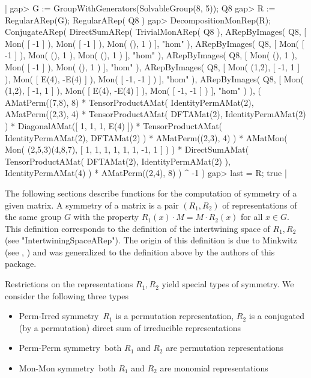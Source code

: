 |    gap> G := GroupWithGenerators(SolvableGroup(8, 5));
    Q8
    gap> R := RegularARep(G);
    RegularARep( Q8 )
    gap> DecompositionMonRep(R);
    ConjugateARep(
      DirectSumARep(
        TrivialMonARep( Q8 ),
        ARepByImages(
          Q8,
          [ Mon( [ -1 ] ), Mon( [ -1 ] ), Mon( (), 1 ) ],
          "hom"
        ),
        ARepByImages(
          Q8,
          [ Mon( [ -1 ] ), Mon( (), 1 ), Mon( (), 1 ) ],
          "hom"
        ),
        ARepByImages(
          Q8,
          [ Mon( (), 1 ), Mon( [ -1 ] ), Mon( (), 1 ) ],
          "hom"
        ),
        ARepByImages(
          Q8,
          [ Mon( (1,2), [ -1, 1 ] ), 
            Mon( [ E(4), -E(4) ] ), 
            Mon( [ -1, -1 ] )
          ],
          "hom"
        ),
        ARepByImages(
          Q8,
          [ Mon( (1,2), [ -1, 1 ] ),
            Mon( [ E(4), -E(4) ] ),
            Mon( [ -1, -1 ] )
          ],
          "hom"
        )
      ),
      ( AMatPerm((7,8), 8) *
        TensorProductAMat(
          IdentityPermAMat(2),
          AMatPerm((2,3), 4) *
          TensorProductAMat(
            DFTAMat(2),
            IdentityPermAMat(2)
          ) *
          DiagonalAMat([ 1, 1, 1, E(4) ]) *
          TensorProductAMat(
            IdentityPermAMat(2),
            DFTAMat(2)
          ) *
          AMatPerm((2,3), 4)
        ) *
        AMatMon( Mon(
          (2,5,3)(4,8,7),
          [ 1, 1, 1, 1, 1, 1, -1, 1 ]
        ) ) *
        DirectSumAMat(
          TensorProductAMat(
            DFTAMat(2),
            IdentityPermAMat(2)
          ),
          IdentityPermAMat(4)
        ) *
        AMatPerm((2,4), 8)
      ) ^ -1
    ) 
    gap>  last = R;                                          
    true |


The following sections describe functions for the computation
of symmetry of a given matrix. A symmetry 
of a matrix is a pair $(R_1, R_2)$ of representations of the 
same group $G$ with the property $R_1(x)\cdot M = M\cdot R_2(x)$
for all $x\in G$.
This definition corresponds to the definition of the 
intertwining space of $R_1, R_2$ (see "IntertwiningSpaceARep").
The origin of this definition is due to Minkwitz 
(see \cite{Min95}, \cite{Min93}) and was generalized to the
definition above by the authors of this package.

Restrictions on the representations $R_1, R_2$ yield special 
types of symmetry. We consider the following three types\:
\begin{itemize}
\item Perm-Irred symmetry\:\ $R_1$ is a permutation representation,
$R_2$ is a conjugated (by a permutation) direct sum of irreducible
representations
\item Perm-Perm symmetry\:\ both $R_1$ and $R_2$ are 
permutation representations
\item Mon-Mon symmetry\:\ both $R_1$ and $R_2$ are 
monomial representations
\end{itemize}

